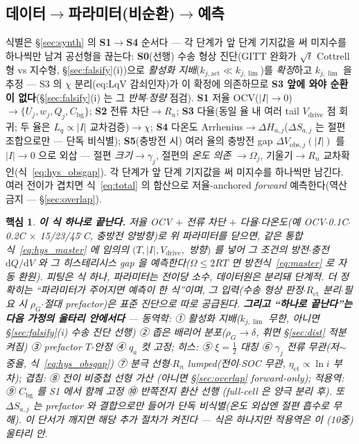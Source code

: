 \documentclass[11pt,a4paper]{article}
\newtheorem*{keybox}{핵심}
\newcommand{\dd}{\mathrm{d}}
\newcommand{\drive}{\mathrm{drive}}
\newcommand{\bg}{\mathrm{bg}}
\begin{document}
\subsection{데이터$\to$파라미터(비순환)$\to$예측}
식별은 \S\ref{sec:synth} 의 \textbf{S1$\to$S4} 순서다 — 각 단계가 앞 단계 기지값을 써 미지수를 하나씩만 남겨 공선형을 끊는다:
\textbf{S0}(선행) 수송 형상 진단(GITT 완화가 $\sqrt t$ Cottrell 형 vs 지수형, \S\ref{sec:falsify}(i))으로 \emph{활성화
지배}($k_{j,\mathrm{act}}\ll k_{j,\lim}$)를 \emph{확정}하고 $k_{j,\lim}$ 을 추정 — S3 의 $\chi$ 분리(eq:LqV 감쇠인자)가 이 확정에
의존하므로 \textbf{S3 앞에 와야 순환이 없다}(\S\ref{sec:falsify}(i) 는 그 \emph{반복$\cdot$정량} 점검). \textbf{S1} 저율
OCV($|I|\!\to\!0$)$\to\{U_j,w_j,Q_j,C_\bg\}$; \textbf{S2} 전류 차단$\to R_n$; \textbf{S3} 다율(동일 율 내 여러 tail $V_\drive$
점 회귀; 두 율은 $L_q\propto|I|$ 교차검증)$\to\chi$; \textbf{S4} 다온도 Arrhenius$\to\Delta H_{a,j}$($\Delta S_{a,j}$ 는 절편
조합으로만 — 단독 비식별); \textbf{S5}(충방전 시) 여러 율의 충방전 gap
$\Delta V_{\mathrm{obs},j}(|I|)$ 를 $|I|\!\to\!0$ 으로 외삽 — 절편 \emph{크기}$\to\gamma_j$, 절편의 \emph{온도 의존}
$\to\Omega_j$, 기울기$\to R_n$ 교차확인(식~\eqref{eq:hys_obsgap}). 각 단계가 앞 단계 기지값을 써 미지수를
하나씩만 남긴다. 여러 전이가 겹치면 식~\eqref{eq:total} 의 합산으로 저율-anchored \emph{forward} 예측한다(역산
금지 — \S\ref{sec:overlap}).
\begin{keybox}
\textbf{이 식 하나로 끝난다.} 저율 OCV $+$ 전류 차단 $+$ 다율$\cdot$다온도(예 OCV$\cdot$0.1C$\cdot$0.2C $\times$
15/23/45$^\circ$C, 충방전 양방향)로 위 파라미터를 닫으면, \emph{같은 통합식~\eqref{eq:hys_master} 에 임의의}
$(T,|I|,V_\drive,$ 방향$)$ 를 넣어 그 조건의 \emph{방전$\cdot$충전} $\dd Q/\dd V$ 와 그 히스테리시스 gap 을
\emph{예측}한다($\Omega\le2RT$ 면 방전식~\eqref{eq:master} 로 자동 환원). 피팅은 식 하나, 파라미터는 전이당 소수,
데이터원은 분리돼 단계적. 더 정확히는 ``\emph{파라미터가 주어지면 예측이 한 식}''이며, 그 \emph{입력}(수송 형상
판정$\cdot$$R_\mathrm{ct}$ 분리$\cdot$필요 시 $\rho_G$$\cdot$절대 prefactor)은 표준 진단으로 따로 공급된다. \textbf{그리고
``하나로 끝난다''는 다음 가정의 울타리 안에서다} — \emph{동역학}: ① 활성화 지배($k_{j,\lim}$ 무한, 아니면
\S\ref{sec:falsify}(i) 수송 진단 선행) ② 좁은 배리어 분포($\rho_G\to\delta$, 휘면 \S\ref{sec:dist} 적분 켜짐)
③ prefactor $T$-안정 ④ $q_a$ 컷 고정; \emph{히스}: ⑤ $\xi=\tfrac12$ 대칭 ⑥ $\gamma_j$ 전류 무관(저$\sim$중율, 식~\eqref{eq:hys_obsgap})
⑦ 분극 선형$\cdot$$R_n$ lumped(전이$\cdot$SOC 무관, $\eta_\mathrm{ct}\propto\ln i$ 부차); \emph{겹침}: ⑧ 전이 비중첩 선형 가산
(아니면 \S\ref{sec:overlap} forward-only); \emph{적용역}: ⑨ $C_\bg$ 를 S1 에서 함께 고정 ⑩ \emph{반쪽전지} 환산 선행
(full-cell 은 양극 분리 후). 또 $\Delta S_{a,j}$ 는 prefactor 와 결합으로만 들어가 \emph{단독 비식별}(온도 외삽엔 절편
흡수로 무해). 이 단서가 깨지면 해당 추가 절차가 켜진다 — \emph{식은 하나지만 적용역은 이 (10중) 울타리 안}.
\end{keybox}
\end{document}
